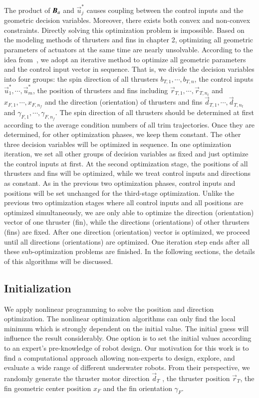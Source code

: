 The product of $\emph{\textbf{B}}_{a}$ and $\vec{u}_{j}^{*}$ causes coupling between the control inputs and the geometric decision variables. Moreover, there exists both convex and non-convex constraints. Directly solving this optimization problem is impossible. Based on the modeling methods of thrusters and fins in chapter 2, optimizing all geometric parameters of actuators at the same time are nearly unsolvable. According to the idea from~\cite{Du2016}, we adopt an iterative method to optimize all geometric parameters and the control input vector in sequence. That is, we divide the decision variables into four groups: the spin direction of all thrusters $b_{T,1}, \cdots, b_{T,n}$, the control inputs $\vec{u}^{*}_{1}, \cdots, \vec{u}^{*}_{m}$, the position of thrusters and fins including $\vec{r}_{T,1}, \cdots, \vec{r}_{T,n_{t}}$ and $x_{F,1}, \cdots, x_{F,n_{f}}$ and the direction (orientation) of thrusters and fins $\vec{d}_{T,1}, \cdots, \vec{d}_{T,n_{t}}$ and $\gamma_{F,1}, \cdots, \gamma_{F,n_{f}}$. The spin direction of all thrusters should be determined at first according to the average condition numbers of all trim trajectories. Once they are determined, for other optimization phases, we keep them constant. The other three decision variables will be optimized in sequence. In one optimization iteration, we set all other groups of decision variables as fixed and just optimize the control inputs at first. At the second optimization stage, the positions of all thrusters and fins will be optimized, while we treat control inputs and directions as constant. As in the previous two optimization phases, control inputs and positions will be set unchanged for the third-stage optimization. Unlike the previous two optimization stages where all control inputs and all positions are optimized simultaneously, we are only able to optimize the direction (orientation) vector of one thruster (fin), while the directions (orientations) of other thrusters (fins) are fixed. After one direction (orientation) vector is optimized, we proceed until all directions (orientations) are optimized. One iteration step ends after all these sub-optimization problems are finished. In the following sections, the details of this algorithms will be discussed.
\subsection{Initialization}
We apply nonlinear programming to solve the position and direction optimization. The nonlinear optimization algorithms can only find the local minimum which is strongly dependent on the initial value. The initial guess will influence the result considerably. One option is to set the initial values according to an expert's pre-knowledge of robot design. Our motivation for this work is to find a computational approach allowing non-experts to design, explore, and evaluate a wide range of different underwater robots. From their perspective, we randomly generate the thruster motor direction $\vec{d}_{T}$ , the thruster position $\vec{r}_{T}$, the fin geometric center position $x_{F}$ and the fin orientation $\gamma_{F}$. 


